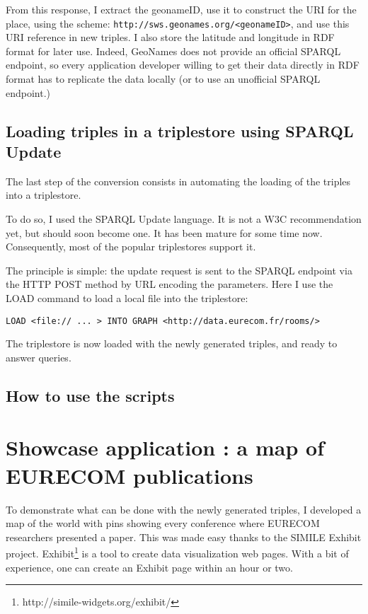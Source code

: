 \documentclass[a4paper,11pt]{report}
\begin{document}
From this response, I extract the geonameID, use it to construct the URI for the place, using the scheme: \texttt{http://sws.geonames.org/<geonameID>}, and use this URI reference in new triples. I also store the latitude and longitude in RDF format for later use. Indeed, GeoNames does not provide an official SPARQL endpoint, so every application developer willing to get their data directly in RDF format has to replicate the data locally (or to use an unofficial SPARQL endpoint.)
\section{Loading triples in a triplestore using SPARQL Update}

The last step of the conversion consists in automating the loading of the triples into a triplestore.

To do so, I used the SPARQL Update language. It is not a W3C recommendation yet, but should soon become one. It has been mature for some time now. Consequently, most of the popular triplestores support it. 

The principle is simple: the update request is sent to the SPARQL endpoint via the HTTP POST method by URL encoding the parameters. Here I use the LOAD command to load a local file into the triplestore:
\begin{verbatim}
LOAD <file:// ... > INTO GRAPH <http://data.eurecom.fr/rooms/>
\end{verbatim}

The triplestore is now loaded with the newly generated triples, and ready to answer queries. 

\section{How to use the scripts}


\chapter{Showcase application : a map of EURECOM publications}
To demonstrate what can be done with the newly generated triples, I developed a map of the world with pins showing every conference where EURECOM researchers presented a paper. This was made easy thanks to the SIMILE Exhibit project. Exhibit\footnote{http://simile-widgets.org/exhibit/} is a tool to create data visualization web pages. With a bit of experience, one can create an Exhibit page within an hour or two. 
\end{document}
